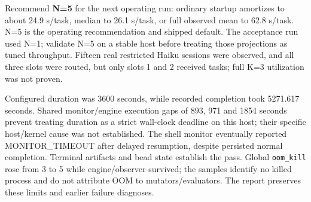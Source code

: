 \documentclass[11pt]{article}
\newcommand{\code}[1]{\texttt{#1}}
\begin{document}
Recommend \textbf{N=5} for the next operating run: ordinary startup amortizes
to about 24.9 s/task, median to 26.1 s/task, or full observed mean to 62.8 s/task.
N=5 is the operating recommendation and shipped default. The acceptance run
used N=1; validate N=5 on a stable host before treating those projections as
tuned throughput.
Fifteen real restricted Haiku sessions were observed, and all three slots were
routed, but only slots 1 and 2 received tasks; full K=3 utilization was not proven.

Configured duration was 3600 seconds, while recorded completion took 5271.617
seconds. Shared monitor/engine execution gaps of 893, 971 and 1854 seconds
prevent treating duration as a strict wall-clock deadline on this host; their
specific host/kernel cause was not established. The shell monitor eventually
reported MONITOR\_TIMEOUT after delayed resumption, despite persisted normal
completion. Terminal artifacts and bead state establish the pass. Global
\code{oom\_kill} rose from 3 to 5 while engine/observer survived; the samples
identify no killed process and do not attribute OOM to mutators/evaluators.
The report preserves these limits and earlier failure diagnoses.
\end{document}

